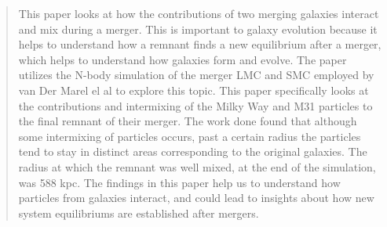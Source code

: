 \documentclass[linenumbers,trackchanges,twocolumn]{aastex7}
\begin{document}
\author[orcid=0000-0000-0000-0001,sname='Catherine Snyder']{Catherine Snyder}



\begin{abstract}
    This paper looks at how the contributions of two merging galaxies interact and mix during a merger. This is important to galaxy evolution because it helps to understand how a remnant finds a new equilibrium after a merger, which helps to understand how galaxies form and evolve. The paper utilizes the N-body simulation of the merger LMC and SMC employed by van Der Marel el al to explore this topic. This paper specifically looks at the contributions and intermixing of the Milky Way and M31 particles to the final remnant of their merger. The work done found that although some intermixing of particles occurs, past a certain radius the particles tend to stay in distinct areas corresponding to the original galaxies. The radius at which the remnant was well mixed, at the end of the simulation, was 588 kpc. The findings in this paper help us to understand how particles from galaxies interact, and could lead to insights about how new system equilibriums are established after mergers. 
\end{abstract}







\end{document}
